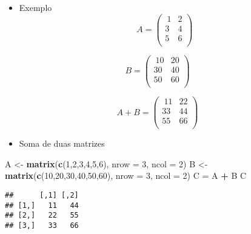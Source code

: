 \documentclass[
]{article}
\newenvironment{Shaded}{\begin{snugshade}}{\end{snugshade}}
\newcommand{\AttributeTok}[1]{\textcolor[rgb]{0.13,0.29,0.53}{#1}}
\newcommand{\DecValTok}[1]{\textcolor[rgb]{0.00,0.00,0.81}{#1}}
\newcommand{\FunctionTok}[1]{\textcolor[rgb]{0.13,0.29,0.53}{\textbf{#1}}}
\newcommand{\NormalTok}[1]{#1}
\newcommand{\OtherTok}[1]{\textcolor[rgb]{0.56,0.35,0.01}{#1}}
\newcommand{\SpecialCharTok}[1]{\textcolor[rgb]{0.81,0.36,0.00}{\textbf{#1}}}
\providecommand{\tightlist}{%
  \setlength{\itemsep}{0pt}\setlength{\parskip}{0pt}}
\begin{document}
\begin{itemize}
\tightlist
\item
  Exemplo \[A = \begin{pmatrix}\
  1 & 2\\
  3 & 4\\
  5 & 6\\
  \end{pmatrix}\]
\end{itemize}

\[B = \begin{pmatrix}\
10 & 20\\
30 & 40\\
50 & 60\\
\end{pmatrix}\]

\[A + B = \begin{pmatrix}\
11 & 22\\
33 & 44\\
55 & 66\\
\end{pmatrix}\]

\begin{itemize}
\tightlist
\item
  Soma de duas matrizes
\end{itemize}

\begin{Shaded}
\begin{Highlighting}[]
\NormalTok{A }\OtherTok{\textless{}{-}} \FunctionTok{matrix}\NormalTok{(}\FunctionTok{c}\NormalTok{(}\DecValTok{1}\NormalTok{,}\DecValTok{2}\NormalTok{,}\DecValTok{3}\NormalTok{,}\DecValTok{4}\NormalTok{,}\DecValTok{5}\NormalTok{,}\DecValTok{6}\NormalTok{),}
\AttributeTok{nrow =} \DecValTok{3}\NormalTok{, }\AttributeTok{ncol =} \DecValTok{2}\NormalTok{)}
\NormalTok{B }\OtherTok{\textless{}{-}} \FunctionTok{matrix}\NormalTok{(}\FunctionTok{c}\NormalTok{(}\DecValTok{10}\NormalTok{,}\DecValTok{20}\NormalTok{,}\DecValTok{30}\NormalTok{,}\DecValTok{40}\NormalTok{,}\DecValTok{50}\NormalTok{,}\DecValTok{60}\NormalTok{),}
\AttributeTok{nrow =} \DecValTok{3}\NormalTok{, }\AttributeTok{ncol =} \DecValTok{2}\NormalTok{)}
\NormalTok{C }\OtherTok{=}\NormalTok{ A }\SpecialCharTok{+}\NormalTok{ B}
\NormalTok{C}
\end{Highlighting}
\end{Shaded}

\begin{verbatim}
##      [,1] [,2]
## [1,]   11   44
## [2,]   22   55
## [3,]   33   66
\end{verbatim}
\end{document}

